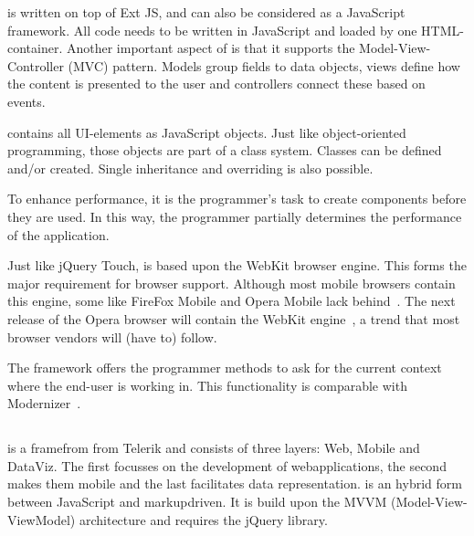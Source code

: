 \documentclass[a4paper]{artikel3}
\newcommand{\setspace}[0]{\vspace{2mm}}
\renewcommand{\paragraph}[1]{\setspace \noindent {\bf #1}  }
\begin{document}
\paragraph{Code and development}
\sta{} is written on top of Ext JS,  and can also be considered as a JavaScript framework.  
All code needs to be written in JavaScript and loaded by one HTML-container.  
Another important aspect of \sta{} is that it supports the Model-View-Controller (MVC) pattern.  
Models group fields to data objects,  views define how the content is presented to the user and controllers connect these based on events.

\sta{} contains all UI-elements as JavaScript objects.  
Just like object-oriented programming,  those objects are part of a class system.  
Classes can be defined and/or created.  
Single inheritance and overriding is also possible.    

To enhance performance,  it is the programmer's task to create components before they are used.  
In this way,  the programmer partially determines the performance of the application.

\paragraph{Browser support}
Just like jQuery Touch,  \sta{} is based upon the WebKit browser engine.  
This forms the major requirement for browser support.  
Although most mobile browsers contain this engine,  some like FireFox Mobile and Opera Mobile lack behind~\cite{JohnEClark2012}.  
The next release of the Opera browser will contain the WebKit engine~\cite{Wokke2013}, a trend that most browser vendors will (have to) follow.

The framework offers the programmer methods to ask for the current context where the end-user is working in.
This functionality is comparable with Modernizer~\cite{Modernizr2012}.  


\subsection{\kendo} %
\label{sec:frameworks-kendo}

\kendo{} is a framefrom from Telerik and consists of three layers:  \kendo{} Web,  \kendo{} Mobile and \kendo{} DataViz.
The first focusses on the development of webapplications,  the second makes them mobile and the last facilitates data representation.
\kendo{} is an hybrid form between JavaScript and markupdriven.
It is build upon the MVVM (Model-View-ViewModel) architecture and requires the jQuery library.
\end{document}
